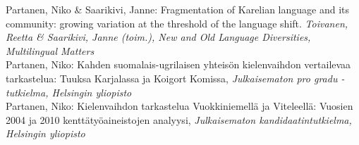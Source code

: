 \documentclass[11pt, a4paper]{article}
\newcommand{\years}[1]{\marginnote{\scriptsize #1}} %
\begin{document}
\years{2016} Partanen, Niko \& Saarikivi, Janne: Fragmentation of Karelian language and its community: growing variation at the threshold of the language shift. \emph{Toivanen, Reetta \& Saarikivi, Janne (toim.), New and Old Language Diversities, Multilingual Matters}\\


\years{2013}Partanen, Niko: Kahden suomalais-ugrilaisen yhteisön kielenvaihdon vertailevaa tarkastelua: Tuuksa Karjalassa ja Koigort Komissa, \emph{Julkaisematon pro gradu -tutkielma, Helsingin yliopisto}\\

\years{2013}Partanen, Niko: Kielenvaihdon tarkastelua Vuokkiniemellä ja Viteleellä: Vuosien 2004 ja 2010 kenttätyöaineistojen analyysi, \emph{Julkaisematon kandidaatintutkielma, Helsingin yliopisto}\\





\end{document}
